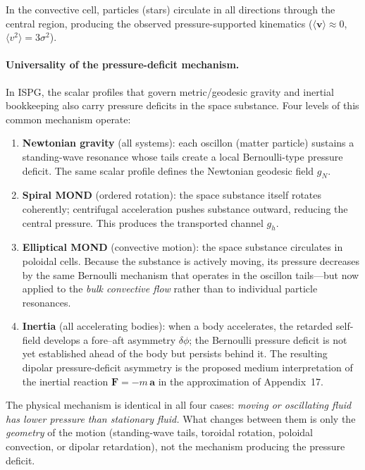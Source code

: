 \documentclass[11pt]{article}
\begin{document}
In the convective cell, particles (stars) circulate in all directions
through the central region, producing the observed
pressure-supported kinematics ($\langle\mathbf{v}\rangle \approx 0$,
$\langle v^2\rangle = 3\sigma^2$).

\paragraph{Universality of the pressure-deficit mechanism.}
In ISPG, the scalar profiles that govern metric/geodesic gravity and
inertial bookkeeping also carry pressure deficits in the space substance.
Four levels of this common mechanism operate:
\begin{enumerate}
\item \textbf{Newtonian gravity} (all systems):
  each oscillon (matter particle) sustains a standing-wave resonance
  whose tails create a local Bernoulli-type pressure deficit.
  The same scalar profile defines the Newtonian geodesic field $g_N$.
\item \textbf{Spiral MOND} (ordered rotation):
  the space substance itself rotates coherently; centrifugal
  acceleration pushes substance outward, reducing the central
  pressure.  This produces the transported channel $g_h$.
\item \textbf{Elliptical MOND} (convective motion):
  the space substance circulates in poloidal cells.  Because the
  substance is actively moving, its pressure decreases by the same
  Bernoulli mechanism that operates in the oscillon tails---but now
  applied to the \emph{bulk convective flow} rather than to individual
  particle resonances.
\item \textbf{Inertia} (all accelerating bodies):
  when a body accelerates, the retarded self-field develops a
  fore--aft asymmetry $\delta\phi$; the Bernoulli pressure
  deficit is not yet established ahead of the body but persists
  behind it.  The resulting dipolar pressure-deficit asymmetry is
  the proposed medium interpretation of the inertial reaction
  $\mathbf{F} = -m\,\mathbf{a}$ in the approximation of
  Appendix~17.
\end{enumerate}
\noindent The physical mechanism is identical in all four cases:
\emph{moving or oscillating fluid has lower pressure than
stationary fluid.}
What changes between them is only the \emph{geometry} of the
motion (standing-wave tails, toroidal rotation, poloidal
convection, or dipolar retardation), not the mechanism
producing the pressure deficit.
\end{document}
